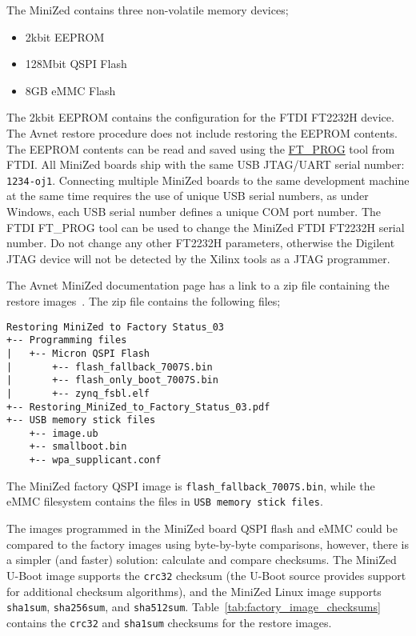 The MiniZed contains three non-volatile memory devices;
%
\begin{itemize}
\item 2kbit EEPROM
\item 128Mbit QSPI Flash
\item 8GB eMMC Flash
\end{itemize}
%
The 2kbit EEPROM contains the configuration for the FTDI FT2232H device.
The Avnet restore procedure does not include restoring the EEPROM contents.
The EEPROM contents can be read and saved using the
\href{https://www.ftdichip.com/Support/Utilities.htm#FT_PROG}{FT\_PROG}
tool from FTDI. All MiniZed boards ship with the same
USB JTAG/UART serial number: \verb+1234-oj1+. Connecting multiple MiniZed
boards to the same development machine at the same time requires the use
of unique USB serial numbers, as under Windows, each USB serial number defines
a unique COM port number. The FTDI FT\_PROG tool can be used to change the
MiniZed FTDI FT2232H serial number. Do not change any other FT2232H parameters,
otherwise the Digilent JTAG device will not be detected by the Xilinx tools
as a JTAG programmer.

The Avnet MiniZed documentation page has a link to a zip file containing
the restore images~\cite{Avnet_MiniZed_Restore_2018}. The zip file contains
the following files;
%
\begin{verbatim}
Restoring MiniZed to Factory Status_03
+-- Programming files
|   +-- Micron QSPI Flash
|       +-- flash_fallback_7007S.bin
|       +-- flash_only_boot_7007S.bin
|       +-- zynq_fsbl.elf
+-- Restoring_MiniZed_to_Factory_Status_03.pdf
+-- USB memory stick files
    +-- image.ub
    +-- smallboot.bin
    +-- wpa_supplicant.conf
\end{verbatim}
%
The MiniZed factory QSPI image is \verb+flash_fallback_7007S.bin+,
while the eMMC filesystem contains the files in \verb+USB memory stick files+.

The images programmed in the MiniZed board QSPI flash and eMMC could be
compared to the factory images using byte-by-byte comparisons, however,
there is a simpler (and faster) solution: calculate and compare checksums.
The MiniZed U-Boot image supports the \verb+crc32+ checksum (the U-Boot
source provides support for additional checksum algorithms), and the MiniZed Linux image
supports \verb+sha1sum+, \verb+sha256sum+, and \verb+sha512sum+.
Table~\ref{tab:factory_image_checksums} contains the \verb+crc32+
and \verb+sha1sum+ checksums for the restore images.


